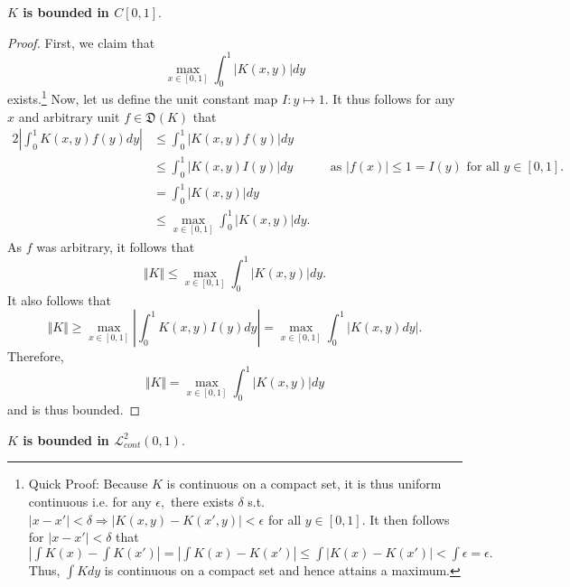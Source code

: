 \documentclass[10pt]{article}
\begin{document}
\noindent
\textbf{$K$ is bounded in $C[0,1].$}
\begin{proof}
    First, we claim that
    \[\max_{x\in[0,1]} \int_{0}^{1} |K(x,y)| dy\]
    exists.\footnote{Quick Proof: Because $K$ is continuous on a compact set, it is thus uniform continuous i.e. for any $\epsilon,$ there exists $\delta$ s.t. $|x-x'|<\delta \Rightarrow |K(x,y)-K(x',y)|<\epsilon$ for all $y\in[0,1].$ It then follows for $|x-x'|<\delta$ that $|\int K(x) - \int K(x')| = |\int K(x)-K(x')|\le\int |K(x)-K(x')|< \int \epsilon = \epsilon.$ Thus, $\int Kdy$ is continuous on a compact set and hence attains a maximum.}
    Now, let us define the unit constant map $I:y\mapsto 1.$ It thus follows for any $x$ and arbitrary unit $f\in\mathfrak{D}(K)$ that
    \begingroup
    \allowdisplaybreaks
    \begin{alignat*}{2}
        \left | \int_{0}^{1}K(x,y)f(y)dy \right | &\le \int_{0}^{1} |K(x,y)f(y)| dy\\
        &\le \int_{0}^{1} |K(x,y)I(y)| dy \quad&&\text{as $|f(x)|\le 1 = I(y)$ for all $y\in[0,1].$}\\
        &= \int_{0}^{1} |K(x,y)| dy\\
        &\le \max_{x\in[0,1]} \int_{0}^{1} |K(x,y)| dy.
    \end{alignat*}
    \endgroup
    As $f$ was arbitrary, it follows that
    \[\Vert K \Vert \le \max_{x\in[0,1]} \int_{0}^{1} |K(x,y)| dy.\]
    It also follows that
    \[\Vert K \Vert \ge \max_{x\in[0,1]}\left |  \int_{0}^{1} K(x,y)I(y) dy \right | = \max_{x\in[0,1]} \int_{0}^{1} \left | K(x,y) dy \right |.\]
    Therefore,
    \[\Vert K \Vert = \max_{x\in[0,1]} \int_{0}^{1} |K(x,y)| dy\]
    and is thus bounded.
\end{proof}


\noindent
\textbf{$K$ is bounded in $\mathcal{L}^2_{cont}(0,1).$}
\end{document}

